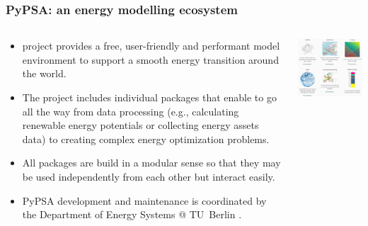 \begin{frame}
  \frametitle{PyPSA: an energy modelling ecosystem}

\begin{columns}[T]
\begin{column}{7cm}

{\footnotesize
  \begin{itemize}
  \item {} project provides a free, user-friendly and performant model environment to support a smooth energy transition around the world. 
  \item The project includes individual packages that enable to go all the way from data processing (e.g., calculating renewable energy potentials or collecting energy assets data) to creating complex energy optimization problems. 
  \item All packages are build in a modular sense so that they may be used independently from each other but interact easily.
  \item PyPSA development and maintenance is coordinated by the Department of Energy Systems @ TU~Berlin .  
  \end{itemize}
}
\end{column}
\begin{column}{9cm}

\centering
\includegraphics[width=8.5cm]{images/pypsa-web.png}

\end{column}
\end{columns}

\end{frame}




